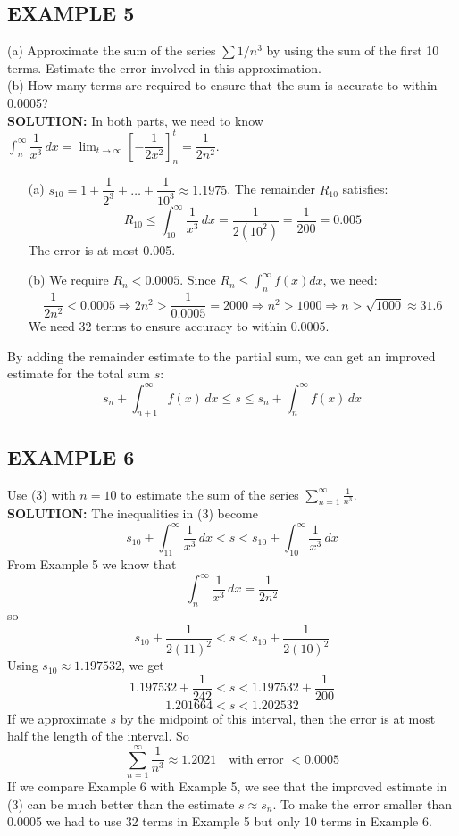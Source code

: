 \documentclass{article}
\begin{document}
\subsection*{EXAMPLE 5}
(a) Approximate the sum of the series \( \sum 1/n^3 \) by using the sum of the first 10 terms. Estimate the error involved in this approximation. \\
(b) How many terms are required to ensure that the sum is accurate to within 0.0005?\\
\textbf{SOLUTION:}
In both parts, we need to know \( \int_n^\infty \dfrac{1}{x^3} \,dx = \lim_{t\to\infty} \left[ -\dfrac{1}{2x^2} \right]_n^t = \dfrac{1}{2n^2} \).
\begin{itemize}
    \item[(a)] \( s_{10} = 1 + \dfrac{1}{2^3} + \dots + \dfrac{1}{10^3} \approx 1.1975 \). The remainder \(R_{10}\) satisfies:
    \[ R_{10} \le \int_{10}^\infty \dfrac{1}{x^3} \,dx = \dfrac{1}{2(10^2)} = \dfrac{1}{200} = 0.005 \]
    The error is at most 0.005.
    \item[(b)] We require \(R_n < 0.0005\). Since \(R_n \le \int_n^\infty f(x) dx\), we need:
    \[ \dfrac{1}{2n^2} < 0.0005 \Rightarrow 2n^2 > \dfrac{1}{0.0005} = 2000 \Rightarrow n^2 > 1000 \Rightarrow n > \sqrt{1000} \approx 31.6 \]
    We need 32 terms to ensure accuracy to within 0.0005.
\end{itemize}

By adding the remainder estimate to the partial sum, we can get an improved estimate for the total sum \(s\):
\[ s_n + \int_{n+1}^\infty f(x) \,dx \le s \le s_n + \int_n^\infty f(x) \,dx \]

\subsection*{EXAMPLE 6}
Use (3) with \( n = 10 \) to estimate the sum of the series \( \sum_{n=1}^{\infty} \frac{1}{n^3} \).\\
\textbf{SOLUTION:}
The inequalities in (3) become
\[ s_{10} + \int_{11}^{\infty} \frac{1}{x^3} \,dx < s < s_{10} + \int_{10}^{\infty} \frac{1}{x^3} \,dx \]
From Example 5 we know that
\[ \int_n^\infty \frac{1}{x^3} \,dx = \frac{1}{2n^2} \]
so
\[ s_{10} + \frac{1}{2(11)^2} < s < s_{10} + \frac{1}{2(10)^2} \]
Using \( s_{10} \approx 1.197532 \), we get
\[ 1.197532 + \frac{1}{242} < s < 1.197532 + \frac{1}{200} \]
\[ 1.201664 < s < 1.202532 \]
If we approximate \( s \) by the midpoint of this interval, then the error is at most half the length of the interval. So
\[ \sum_{n=1}^{\infty} \frac{1}{n^3} \approx 1.2021 \quad \text{with error } < 0.0005 \]
If we compare Example 6 with Example 5, we see that the improved estimate in (3) can be much better than the estimate \( s \approx s_n \). To make the error smaller than 0.0005 we had to use 32 terms in Example 5 but only 10 terms in Example 6.
\end{document}
